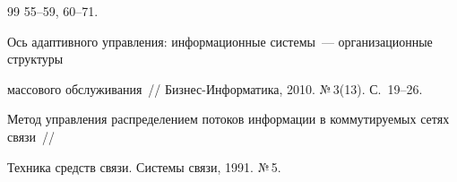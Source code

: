 {{\begin{thebibliography}{99}
55--59, 60--71.









Ось адаптивного управления: информационные системы~--- организационные структуры 


массового обслуживания~/\!\!/  Биз\-нес-Ин\-фор\-ма\-ти\-ка, 2010. №\,3(13). С.~19--26.





\label{end\stat}









Метод управления распределением потоков информации в коммутируемых сетях связи~/\!\!/ 


Техника средств связи. Системы связи, 1991. №\,5.


 \end{thebibliography}


}


}


